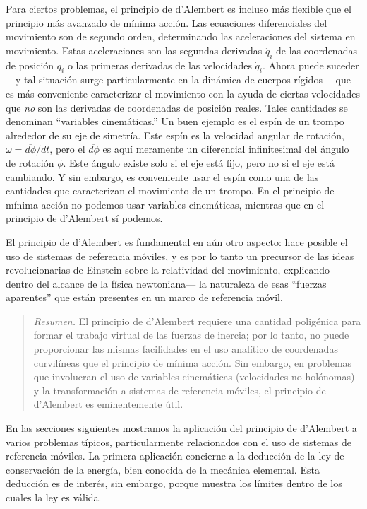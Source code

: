 \documentclass[12pt,a4paper]{book}
\begin{document}
Para ciertos problemas, el principio de d'Alembert es incluso más flexible que el principio más avanzado de mínima acción. Las ecuaciones diferenciales del movimiento son de segundo orden, determinando las aceleraciones del sistema en movimiento. Estas aceleraciones son las segundas derivadas $\ddot{q}_i$ de las coordenadas de posición $q_i$ o las primeras derivadas de las velocidades $\dot{q}_i$. Ahora puede suceder ---y tal situación surge particularmente en la dinámica de cuerpos rígidos--- que es más conveniente caracterizar el movimiento con la ayuda de ciertas velocidades que \textit{no} son las derivadas de coordenadas de posición reales. Tales cantidades se denominan ``variables cinemáticas.'' Un buen ejemplo es el espín de un trompo alrededor de su eje de simetría. Este espín es la velocidad angular de rotación, $\omega = \overline{d\phi}/dt$, pero el $\overline{d\phi}$ es aquí meramente un diferencial infinitesimal del ángulo de rotación $\phi$. Este ángulo existe solo si el eje está fijo, pero no si el eje está cambiando. Y sin embargo, es conveniente usar el espín como una de las cantidades que caracterizan el movimiento de un trompo. En el principio de mínima acción no podemos usar variables cinemáticas, mientras que en el principio de d'Alembert sí podemos.

El principio de d'Alembert es fundamental en aún otro aspecto: hace posible el uso de sistemas de referencia móviles, y es por lo tanto un precursor de las ideas revolucionarias de Einstein sobre la relatividad del movimiento, explicando ---dentro del alcance de la física newtoniana--- la naturaleza de esas ``fuerzas aparentes'' que están presentes en un marco de referencia móvil.

\begin{quote}
\textit{Resumen.} El principio de d'Alembert requiere una cantidad poligénica para formar el trabajo virtual de las fuerzas de inercia; por lo tanto, no puede proporcionar las mismas facilidades en el uso analítico de coordenadas curvilíneas que el principio de mínima acción. Sin embargo, en problemas que involucran el uso de variables cinemáticas (velocidades no holónomas) y la transformación a sistemas de referencia móviles, el principio de d'Alembert es eminentemente útil.
\end{quote}

En las secciones siguientes mostramos la aplicación del principio de d'Alembert a varios problemas típicos, particularmente relacionados con el uso de sistemas de referencia móviles. La primera aplicación concierne a la deducción de la ley de conservación de la energía, bien conocida de la mecánica elemental. Esta deducción es de interés, sin embargo, porque muestra los límites dentro de los cuales la ley es válida.
\end{document}
